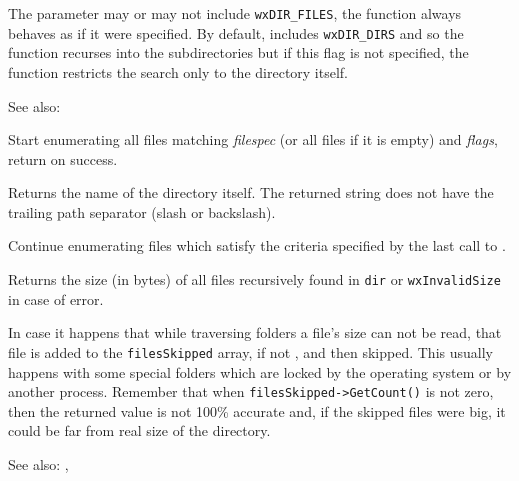 The  parameter may or may not include {\tt wxDIR\_FILES}, the
function always behaves as if it were specified. By default,  
includes {\tt wxDIR\_DIRS} and so the function recurses into the subdirectories
but if this flag is not specified, the function restricts the search only to
the directory  itself.

See also: 


\label{wxdirgetfirst}


Start enumerating all files matching {\it filespec} (or all files if it is
empty) and {\it flags}, return \true on success.


\label{wxdirgetname}


Returns the name of the directory itself. The returned string does not have the
trailing path separator (slash or backslash).


\label{wxdirgetnext}


Continue enumerating files which satisfy the criteria specified by the last
call to .


\label{wxdirgettotalsize}


Returns the size (in bytes) of all files recursively found in {\tt dir} or
{\tt wxInvalidSize} in case of error.

In case it happens that while traversing folders a file's size can not be read,
that file is added to the {\tt filesSkipped} array, if not \NULL, and then
skipped.
This usually happens with some special folders which are locked by the operating system
or by another process. Remember that when {\tt filesSkipped->GetCount()} is not zero,
then the returned value is not 100\% accurate and, if the skipped files were big, it could be
far from real size of the directory.

See also: ,


